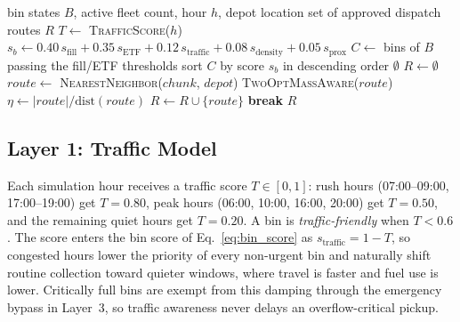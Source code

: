 \documentclass[conference, a4paper]{IEEEtran}
\begin{document}
\begin{algorithm}[t]
\caption{DPET dispatch cycle (executed every simulation hour)}
\label{alg:dpet}
\begin{algorithmic}[1]
\REQUIRE bin states $B$, active fleet count, hour $h$, depot location
\ENSURE set of approved dispatch routes $R$
\STATE $T \gets$ \textsc{TrafficScore}($h$) 
  \STATE $s_b \gets 0.40\,s_{\text{fill}} + 0.35\,s_{\text{ETF}} + 0.12\,s_{\text{traffic}} + 0.08\,s_{\text{density}} + 0.05\,s_{\text{prox}}$ 
\ENDFOR
\STATE $C \gets$ bins of $B$ passing the fill/ETF thresholds 
\STATE sort $C$ by score $s_b$ in descending order
  \RETURN $\emptyset$
\ENDIF
\STATE $R \gets \emptyset$
  \STATE $route \gets$ \textsc{NearestNeighbor}($chunk$, $depot$) 
  \STATE \textsc{TwoOptMassAware}($route$) 
  \STATE $\eta \gets |route| / \mathrm{dist}(route)$ 
    \STATE $R \gets R \cup \{route\}$
  \ENDIF
    \STATE \textbf{break}
  \ENDIF
\ENDFOR
\RETURN $R$ 
\end{algorithmic}
\end{algorithm}

\subsection{Layer 1: Traffic Model}
Each simulation hour receives a traffic score $T\in[0,1]$: rush hours (07:00--09:00, 17:00--19:00) get $T=0.80$, peak hours (06:00, 10:00, 16:00, 20:00) get $T=0.50$, and the remaining quiet hours get $T=0.20$. A bin is \textit{traffic-friendly} when $T<0.6$. The score enters the bin score of Eq.~\eqref{eq:bin_score} as $s_{\text{traffic}}=1-T$, so congested hours lower the priority of every non-urgent bin and naturally shift routine collection toward quieter windows, where travel is faster and fuel use is lower. Critically full bins are exempt from this damping through the emergency bypass in Layer~3, so traffic awareness never delays an overflow-critical pickup.
\end{document}
